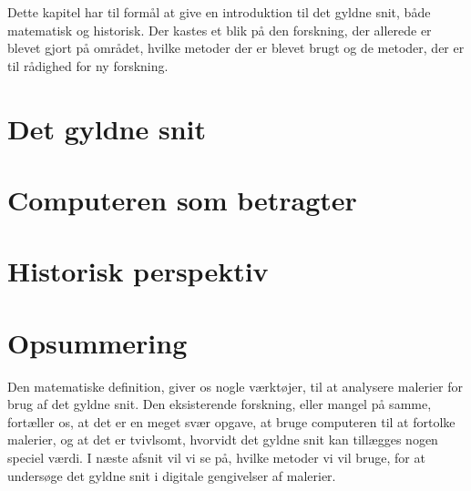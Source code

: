 {
\textsf{
Dette kapitel har til formål at give en introduktion til det gyldne snit,
både matematisk og historisk. Der kastes et blik på den forskning, der
allerede er blevet gjort på området, hvilke metoder der er blevet brugt
og de metoder, der er til rådighed for ny forskning.
}

\section{Det gyldne snit\label{section_gyldne_snit}}


\section{Computeren som betragter\label{section_computer_betragter}}


\section{Historisk perspektiv\label{section_forskning}}


\section*{Opsummering}
Den matematiske definition, giver os nogle værktøjer, til at analysere
malerier for brug af det gyldne snit.  Den eksisterende forskning, eller
mangel på samme, fortæller os, at det er en meget svær opgave, at bruge
computeren til at fortolke malerier, og at det er tvivlsomt, hvorvidt
det gyldne snit kan tillægges nogen speciel værdi.  I næste afsnit vil
vi se på, hvilke metoder vi vil bruge, for at undersøge det gyldne snit
i digitale gengivelser af malerier.

}

